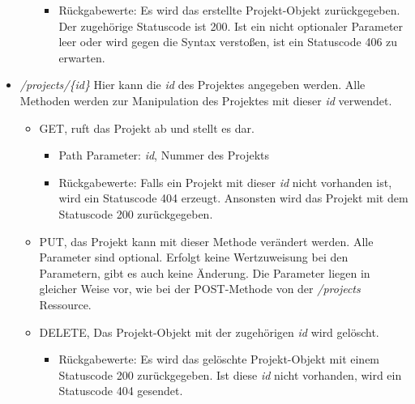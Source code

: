 \documentclass[12pt]{scrartcl}
\begin{document}
\begin{itemize}
\begin{itemize}
\begin{itemize}
\begin{itemize}
					\end{itemize}
					\item Rückgabewerte: Es wird das erstellte Projekt-Objekt zurückgegeben. Der zugehörige Statuscode ist 200. Ist ein nicht optionaler Parameter leer oder wird gegen die Syntax verstoßen, ist ein Statuscode 406 zu erwarten.  
				\end{itemize}
			\end{itemize}
			\item \emph{/projects/\{id\}} Hier kann die \emph{id} des Projektes angegeben werden. Alle Methoden werden zur Manipulation des Projektes mit dieser \emph{id} verwendet.
			\begin{itemize}
				\item GET, ruft das Projekt ab und stellt es dar. 
				\begin{itemize}
					\item Path Parameter: \emph{id}, Nummer des Projekts
					\item Rückgabewerte: Falls ein Projekt mit dieser \emph{id} nicht vorhanden ist, wird ein Statuscode 404 erzeugt. Ansonsten wird das Projekt mit dem Statuscode 200 zurückgegeben.
				\end{itemize}
				\item PUT, das Projekt kann mit dieser Methode verändert werden. Alle Parameter sind optional. Erfolgt keine Wertzuweisung bei den Parametern, gibt es auch keine Änderung. Die Parameter liegen in gleicher Weise vor, wie bei der POST-Methode von der \emph{/projects} Ressource.
				\item DELETE, Das Projekt-Objekt mit der zugehörigen \emph{id} wird gelöscht.
				\begin{itemize}
					\item Rückgabewerte: Es wird das gelöschte Projekt-Objekt mit einem Statuscode 200 zurückgegeben. Ist diese \emph{id} nicht vorhanden, wird ein Statuscode 404 gesendet.
				\end{itemize}	
			\end{itemize}
	\end{itemize}
\end{document}

